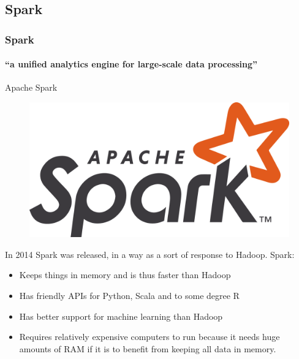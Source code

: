 \documentclass[aspectratio=169,dvipsnames]{beamer}
\begin{document}
\subsection{Spark}
    \begin{frame}
        \frametitle{Spark}
        \framesubtitle{``a unified analytics engine for large-scale data processing''}
        \vspace{-3ex}
        \begin{block}{Apache Spark}
        \begin{figure}
        \vspace{-1\baselineskip}
        \includegraphics[width=0.9\linewidth]{figures/Spark.png}\hfill
        \end{figure}
        In \alert{2014} Spark was released, in a way as a sort of response to Hadoop. Spark:
        \begin{itemize}
            \item Keeps things \alert{in memory} and is thus faster than Hadoop
        \end{itemize}\vspace{-4pt}

        \begin{itemize}
            \item Has \alert{friendly API}s for Python, Scala and to some degree R
            \item Has \alert{better support for machine learning} than Hadoop
            \item Requires \alert{relatively expensive computers} to run because it
            needs huge amounts of RAM if it is to benefit from keeping all data
            in memory.
        \end{itemize}
        \end{block}
    \end{frame}
\end{document}
